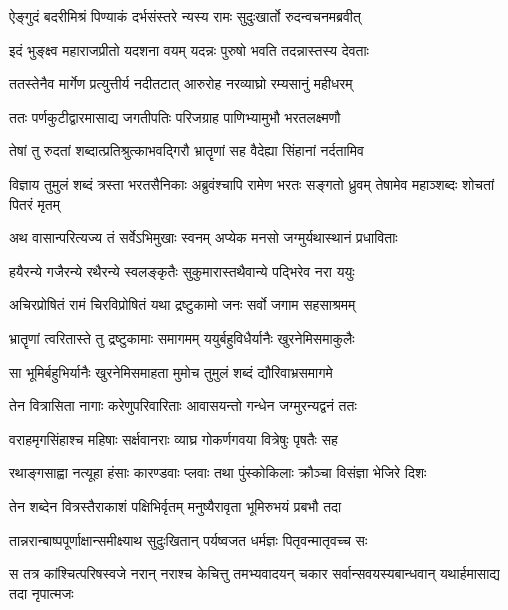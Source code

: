 \twolineshloka
{ऐङ्गुदं बदरीमिश्रं पिण्याकं दर्भसंस्तरे}
{न्यस्य रामः सुदुःखार्तो रुदन्वचनमब्रवीत्} %

\twolineshloka
{इदं भुङ्क्ष्व महाराजप्रीतो यदशना वयम्}
{यदन्नः पुरुषो भवति तदन्नास्तस्य देवताः} %

\twolineshloka
{ततस्तेनैव मार्गेण प्रत्युत्तीर्य नदीतटात्}
{आरुरोह नरव्याघ्रो रम्यसानुं महीधरम्} %

\twolineshloka
{ततः पर्णकुटीद्वारमासाद्य जगतीपतिः}
{परिजग्राह पाणिभ्यामुभौ भरतलक्ष्मणौ} %

\twolineshloka
{तेषां तु रुदतां शब्दात्प्रतिश्रुत्काभवद्गिरौ}
{भ्रातॄणां सह वैदेह्या सिंहानां नर्दतामिव} %

\threelineshloka
{विज्ञाय तुमुलं शब्दं त्रस्ता भरतसैनिकाः}
{अब्रुवंश्चापि रामेण भरतः सङ्गतो ध्रुवम्}
{तेषामेव महाञ्शब्दः शोचतां पितरं मृतम्} %

\twolineshloka
{अथ वासान्परित्यज्य तं सर्वेऽभिमुखाः स्वनम्}
{अप्येक मनसो जग्मुर्यथास्थानं प्रधाविताः} %

\twolineshloka
{हयैरन्ये गजैरन्ये रथैरन्ये स्वलङ्कृतैः}
{सुकुमारास्तथैवान्ये पद्भिरेव नरा ययुः} %

\twolineshloka
{अचिरप्रोषितं रामं चिरविप्रोषितं यथा}
{द्रष्टुकामो जनः सर्वो जगाम सहसाश्रमम्} %

\twolineshloka
{भ्रातॄणां त्वरितास्ते तु द्रष्टुकामाः समागमम्}
{ययुर्बहुविधैर्यानैः खुरनेमिसमाकुलैः} %

\twolineshloka
{सा भूमिर्बहुभिर्यानैः खुरनेमिसमाहता}
{मुमोच तुमुलं शब्दं द्यौरिवाभ्रसमागमे} %

\twolineshloka
{तेन वित्रासिता नागाः करेणुपरिवारिताः}
{आवासयन्तो गन्धेन जग्मुरन्यद्वनं ततः} %

\twolineshloka
{वराहमृगसिंहाश्च महिषाः सर्क्षवानराः}
{व्याघ्र गोकर्णगवया वित्रेषुः पृषतैः सह} %

\twolineshloka
{रथाङ्गसाह्वा नत्यूहा हंसाः कारण्डवाः प्लवाः}
{तथा पुंस्कोकिलाः क्रौञ्चा विसंज्ञा भेजिरे दिशः} %

\twolineshloka
{तेन शब्देन वित्रस्तैराकाशं पक्षिभिर्वृतम्}
{मनुष्यैरावृता भूमिरुभयं प्रबभौ तदा} %

\twolineshloka
{तान्नरान्बाष्पपूर्णाक्षान्समीक्ष्याथ सुदुःखितान्}
{पर्यष्वजत धर्मज्ञः पितृवन्मातृवच्च सः} %

\fourlineindentedshloka
{स तत्र कांश्चित्परिषस्वजे नरान्}
{नराश्च केचित्तु तमभ्यवादयन्}
{चकार सर्वान्सवयस्यबान्धवान्}
{यथार्हमासाद्य तदा नृपात्मजः} %

